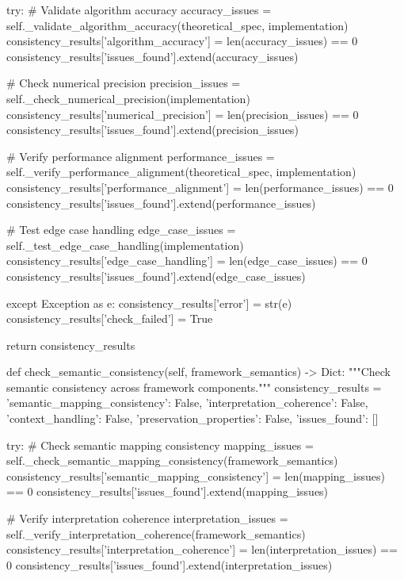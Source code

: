         try:
            \# Validate algorithm accuracy
            accuracy_issues = self._validate_algorithm_accuracy(theoretical_spec, implementation)
            consistency_results['algorithm_accuracy'] = len(accuracy_issues) == 0
            consistency_results['issues_found'].extend(accuracy_issues)
            
            \# Check numerical precision
            precision_issues = self._check_numerical_precision(implementation)
            consistency_results['numerical_precision'] = len(precision_issues) == 0
            consistency_results['issues_found'].extend(precision_issues)
            
            \# Verify performance alignment
            performance_issues = self._verify_performance_alignment(theoretical_spec, implementation)
            consistency_results['performance_alignment'] = len(performance_issues) == 0
            consistency_results['issues_found'].extend(performance_issues)
            
            \# Test edge case handling
            edge_case_issues = self._test_edge_case_handling(implementation)
            consistency_results['edge_case_handling'] = len(edge_case_issues) == 0
            consistency_results['issues_found'].extend(edge_case_issues)
            
        except Exception as e:
            consistency_results['error'] = str(e)
            consistency_results['check_failed'] = True
            
        return consistency_results
        
    def check_semantic_consistency(self, framework_semantics) -> Dict:
        """Check semantic consistency across framework components."""
        consistency_results = {
            'semantic_mapping_consistency': False,
            'interpretation_coherence': False,
            'context_handling': False,
            'preservation_properties': False,
            'issues_found': []
        }
        
        try:
            \# Check semantic mapping consistency
            mapping_issues = self._check_semantic_mapping_consistency(framework_semantics)
            consistency_results['semantic_mapping_consistency'] = len(mapping_issues) == 0
            consistency_results['issues_found'].extend(mapping_issues)
            
            \# Verify interpretation coherence
            interpretation_issues = self._verify_interpretation_coherence(framework_semantics)
            consistency_results['interpretation_coherence'] = len(interpretation_issues) == 0
            consistency_results['issues_found'].extend(interpretation_issues)
            
